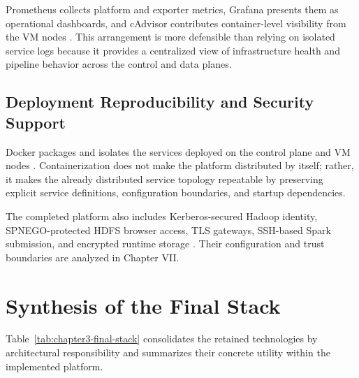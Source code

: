 Prometheus collects platform and exporter metrics, Grafana presents them as operational dashboards, and cAdvisor contributes container-level visibility from the VM nodes \cite{prometheus_docs,grafana_docs,cadvisor_docs}. This arrangement is more defensible than relying on isolated service logs because it provides a centralized view of infrastructure health and pipeline behavior across the control and data planes.

\subsection{Deployment Reproducibility and Security Support}
Docker packages and isolates the services deployed on the control plane and VM nodes \cite{docker_docs}. Containerization does not make the platform distributed by itself; rather, it makes the already distributed service topology repeatable by preserving explicit service definitions, configuration boundaries, and startup dependencies.

The completed platform also includes Kerberos-secured Hadoop identity, SPNEGO-protected HDFS browser access, TLS gateways, SSH-based Spark submission, and encrypted runtime storage \cite{mit_kerberos_docs,openssh_docs,cryptsetup_docs}. Their configuration and trust boundaries are analyzed in Chapter VII.

\section{Synthesis of the Final Stack}
Table~\ref{tab:chapter3-final-stack} consolidates the retained technologies by architectural responsibility and summarizes their concrete utility within the implemented platform.

